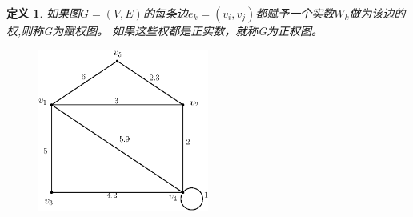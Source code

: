 \documentclass[11pt,a4paper,openany]{book}
\newtheorem{defination}{\textbf{定义}}[section]
\begin{document}
\begin{defination}
如果图$G=(V,E)$的每条边$e_k=(v_i,v_j)$都赋予一个实数$W_k$做为该边的\textcolor[rgb]{1.00,0.00,0.00}{权},则称G为\textcolor[rgb]{1.00,0.00,0.00}{赋权图}。
如果这些权都是正实数，就称G为\textcolor[rgb]{1.00,0.00,0.00}{正权图}。
\begin{figure}[H]
  \centering
  \includegraphics[width=0.5\textwidth]{1_4.eps}\\
  \caption{}
\end{figure}

\end{defination}
\end{document}
